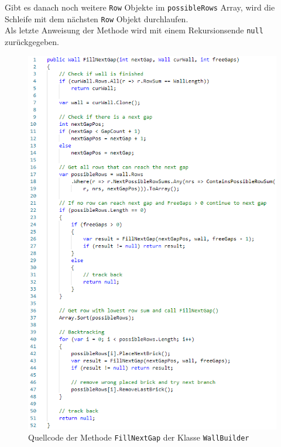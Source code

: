 \documentclass[a4paper,12pt]{article}
\newcommand{\code}{\texttt}
\begin{document}
Gibt es danach noch weitere \code{Row} Objekte im \code{possibleRows} Array, wird die Schleife mit dem nächsten \code{Row} Objekt durchlaufen.
\\[0.4cm]
Als letzte Anweisung der Methode wird mit einem Rekursionsende \code{null} zurückgegeben.
\begin{figure}[H]
    \centering
    \includegraphics[width=.86\linewidth]{Bilder/Aufgabe1/Code.png}
    \caption{Quellcode der Methode \code{FillNextGap} der Klasse \code{WallBuilder}}
\end{figure}
\end{document}
